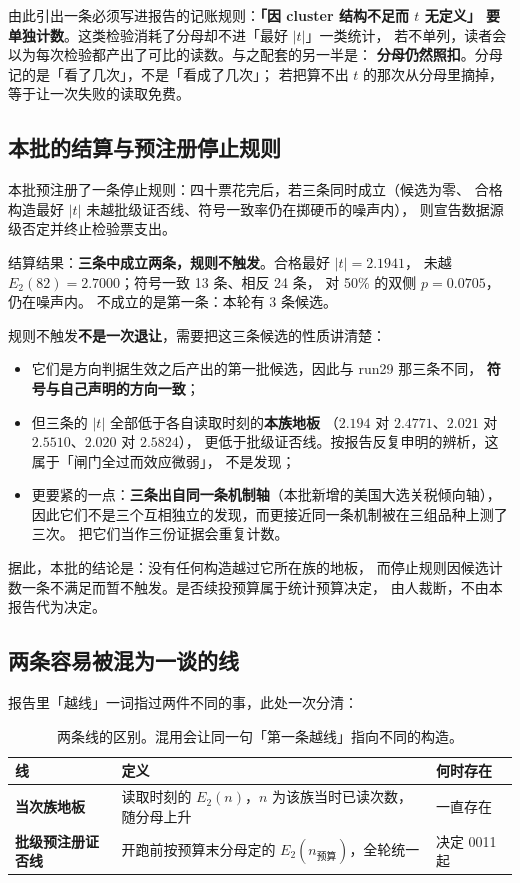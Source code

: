\documentclass[11pt]{ctexart}
\begin{document}
由此引出一条必须写进报告的记账规则：\textbf{「因 cluster 结构不足而 $t$ 无定义」
要单独计数}。这类检验消耗了分母却不进「最好 $|t|$」一类统计，
若不单列，读者会以为每次检验都产出了可比的读数。与之配套的另一半是：
\textbf{分母仍然照扣}。分母记的是「看了几次」，不是「看成了几次」；
若把算不出 $t$ 的那次从分母里摘掉，等于让一次失败的读取免费。

\subsection{本批的结算与预注册停止规则}
本批预注册了一条停止规则：四十票花完后，若三条同时成立（候选为零、
合格构造最好 $|t|$ 未越批级证否线、符号一致率仍在掷硬币的噪声内），
则宣告数据源级否定并终止检验票支出。

结算结果：\textbf{三条中成立两条，规则不触发}。合格最好
$|t|=2.1941$，
未越 $E_2(82)=2.7000$；符号一致
13 条、相反 24 条，
对 50\% 的双侧 $p=0.0705$，仍在噪声内。
不成立的是第一条：本轮有 3 条候选。

规则不触发\textbf{不是一次退让}，需要把这三条候选的性质讲清楚：

\begin{itemize}
\item 它们是方向判据生效之后产出的第一批候选，因此与 run29 那三条不同，
      \textbf{符号与自己声明的方向一致}；
\item 但三条的 $|t|$ 全部低于各自读取时刻的\textbf{本族地板}
      （$2.194$ 对 $2.4771$、$2.021$ 对 $2.5510$、$2.020$ 对 $2.5824$），
      更低于批级证否线。按报告反复申明的辨析，这属于「闸门全过而效应微弱」，
      不是发现；
\item 更要紧的一点：\textbf{三条出自同一条机制轴}（本批新增的美国大选关税倾向轴），
      因此它们不是三个互相独立的发现，而更接近同一条机制被在三组品种上测了三次。
      把它们当作三份证据会重复计数。
\end{itemize}

据此，本批的结论是：没有任何构造越过它所在族的地板，
而停止规则因候选计数一条不满足而暂不触发。是否续投预算属于统计预算决定，
由人裁断，不由本报告代为决定。

\subsection{两条容易被混为一谈的线}
报告里「越线」一词指过两件不同的事，此处一次分清：

\begin{table}[htbp]\centering\footnotesize
\begin{tabular}{@{}>{\raggedright\arraybackslash}p{}
>{\raggedright\arraybackslash}p{}
>{\raggedright\arraybackslash}p{}@{}}
\toprule
线 & 定义 & 何时存在 \\ \midrule
\textbf{当次族地板} & 读取时刻的 $E_2(n)$，$n$ 为该族当时已读次数，随分母上升 & 一直存在 \\
\textbf{批级预注册证否线} & 开跑前按预算末分母定的 $E_2(n_{\text{预算}})$，全轮统一 & 决定 0011 起 \\
\bottomrule\end{tabular}
\caption{两条线的区别。混用会让同一句「第一条越线」指向不同的构造。}
\end{table}
\end{document}
